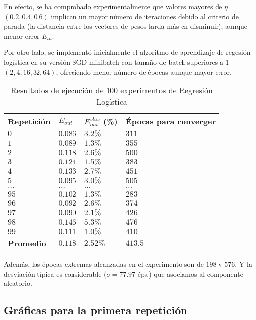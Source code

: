 En efecto, se ha comprobado experimentalmente que valores mayores de $\eta$
$(0.2, 0.4, 0.6)$ implican un mayor número de iteraciones debido al criterio de
parada (la distancia entre los vectores de pesos tarda más en disminuir), aunque
menor error $E_{in}$.

Por otro lado, se implementó inicialmente el algoritmo de aprendizaje de
regesión logística en su versión SGD minibatch con tamaño de batch superiores a $1$
$(2, 4, 16, 32, 64)$, ofreciendo menor número de épocas aunque mayor error.

\begin{table}[H]
    \centering
    \begin{tabular}{llll}
    \toprule
        Repetición & $E_{out}$ & $E_{out}^{clas}$ (\%) & Épocas para converger \\ \midrule
        $0$ & $0.086$ & $3.2 \%$ & $311$ \hfill \\
        $1$ & $0.089$ & $1.3 \%$ & $355$ \hfill \\
        $2$ & $0.118$ & $2.6 \%$ & $500$ \hfill\\
        $3$ & $0.124$ & $1.5 \%$ & $383$ \hfill \\
        $4$ & $0.133$ & $2.7 \%$ & $451$ \hfill \\
        $5$ & $0.095$ & $3.0 \%$ & $505$ \hfill \\
        $\dots$ & $\dots$ & $\dots$ & $\dots$ \hfill \\
        $95$ & $0.102$ & $1.3 \%$ & $283$ \hfill \\
        $96$ & $0.092$ & $2.6 \%$ & $374$ \hfill \\
        $97$ & $0.090$ & $2.1 \%$ & $426$ \hfill \\
        $98$ & $0.146$ & $5.3 \%$ & $476$ \hfill \\
        $99$ & $0.111$ & $1.0 \%$ & $410$ \hfill \\ \bottomrule
        \textbf{Promedio} & \textbf{$0.118$} & \textbf{$2.52 \%$} & \textbf{$413.5$} \\ \bottomrule
    \end{tabular}
    \caption{Resultados de ejecución de 100 experimentos de Regresión Logística}
\end{table}

Además, las épocas extremas alcanzadas en el experimento son de $198$ y $576$. Y
la desviación típica es considerable ($\sigma = 77.97$ éps.) que asociamos al componente
aleatorio.

\subsection{Gráficas para la primera repetición}

